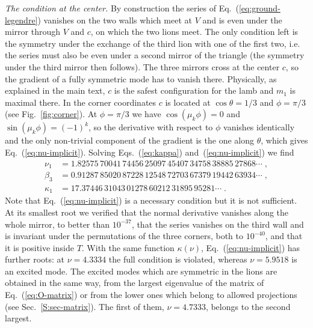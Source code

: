 \emph{The condition at the center.} By construction the series of Eq.~(\ref{eq:ground-legendre}) vanishes on the two walls which meet at $V$ and is even under the mirror through $V$ and $c$, on which the two lions meet. The only condition left is the symmetry under the exchange of the third lion with one of the first two, i.e. the series must also be even under a second mirror of the triangle (the symmetry under the third mirror then follows). The three mirrors cross at the center $c$, so the gradient of a fully symmetric mode has to vanish there. Physically, as explained in the main text, $c$ is the safest configuration for the lamb and $m_1$ is maximal there. In the corner coordinates $c$ is located at $\cos \theta = 1/3$ and $\phi = \pi/3$ (see Fig.~\ref{fig:corner}). At $\phi = \pi/3$ we have $\cos(\mu_k \phi) = 0$ and $\sin(\mu_k \phi) = (-1)^k$, so the derivative with respect to $\phi$ vanishes identically and the only non-trivial component of the gradient is the one along $\theta$, which gives Eq.~(\ref{eq:nu-implicit}). Solving Eqs.~(\ref{eq:kappa}) and~(\ref{eq:nu-implicit}) we find
\begin{align}
    \nu_1 &= 1.82575\,70041\,74456\,25097\,45407\,34758\,38885\,27868 \cdots \;, \nonumber \\
    \beta_3 &= 0.91287\,85020\,87228\,12548\,72703\,67379\,19442\,63934 \cdots \;, \label{S:values} \\
    \kappa_1 &= 17.37446\,31043\,01278\,60212\,31895\,95281 \cdots \;. \nonumber
\end{align}
Note that Eq.~(\ref{eq:nu-implicit}) is a necessary condition but it is not sufficient. At its smallest root we verified that the normal derivative vanishes along the whole mirror, to better than $10^{-37}$, that the series vanishes on the third wall and is invariant under the permutations of the three corners, both to $10^{-40}$, and that it is positive inside $T$. With the same function $\kappa(\nu)$, Eq.~(\ref{eq:nu-implicit}) has further roots: at $\nu = 4.3334$ the full condition is violated, whereas $\nu = 5.9518$ is an excited mode. The excited modes which are symmetric in the lions are obtained in the same way, from the largest eigenvalue of the matrix of Eq.~(\ref{eq:O-matrix}) or from the lower ones which belong to allowed projections (see Sec.~\ref{S:sec-matrix}). The first of them, $\nu = 4.7333$, belongs to the second largest.

